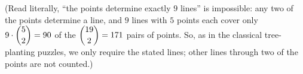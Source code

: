 (Read literally, ``the points determine exactly $9$ lines'' is impossible: any two of the points determine a line, and $9$ lines with $5$ points each cover only $9\cdot\dbinom{5}{2}=90$ of the $\dbinom{19}{2}=171$ pairs of points. So, as in the classical tree-planting puzzles, we only require the stated lines; other lines through two of the points are not counted.)
